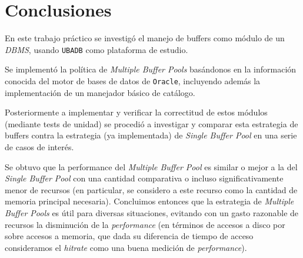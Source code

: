 \section{Conclusiones}

En este trabajo pr\'actico se investig\'o el manejo de buffers como m\'odulo de un \textit{DBMS}, usando \texttt{UBADB} como plataforma de estudio. 

Se implement\'o la pol\'itica de \textit{Multiple Buffer Pools} bas\'andonos en la informaci\'on conocida del motor de bases de datos de \texttt{Oracle}, incluyendo adem\'as la implementaci\'on de un manejador b\'asico de cat\'alogo. 

Posteriormente a implementar y verificar la correctitud de estos m\'odulos (mediante tests de unidad) se procedi\'o a investigar y comparar esta estrategia de buffers contra la estrategia (ya implementada) de \textit{Single Buffer Pool} en una serie de casos de inter\'es. 

Se obtuvo que la performance del \textit{Multiple Buffer Pool} es similar o mejor a la del \textit{Single Buffer Pool} con una cantidad comparativa o incluso significativamente menor de recursos (en particular, se considero a este recurso como la cantidad de memoria principal necesaria). Concluimos entonces que la estrategia de \textit{Multiple Buffer Pools} es \'util para diversas situaciones, evitando con un gasto razonable de recursos la disminuci\'on de la \textit{performance} (en t\'erminos de accesos a disco por sobre accesos a memoria, que dada su diferencia de tiempo de acceso consideramos el \textit{hitrate} como una buena medici\'on de \textit{performance}).
